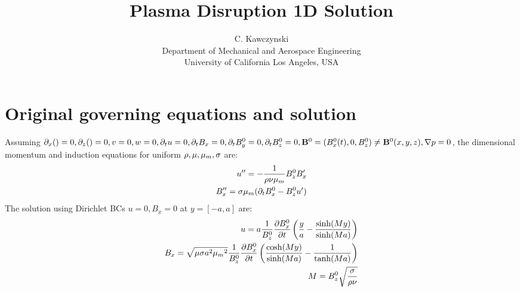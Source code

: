 \documentclass[11pt]{article}
\begin{document}
\doublespacing
\title{Plasma Disruption 1D Solution}
\author{C. Kawczynski \\
Department of Mechanical and Aerospace Engineering \\
University of California Los Angeles, USA\\
}
\maketitle

\section{Original governing equations and solution}
Assuming $\partial_x () =0, \partial_z () = 0, v=0,w=0, \partial_t u = 0, \partial_t B_x = 0,\partial_t B_y^0 = 0, \partial_t B_z^0 = 0,\mathbf{B}^0 = (B_x^0(t),0,B_z^0) \ne \mathbf{B}^0(x,y,z), \nabla p =0$, the dimensional momentum and induction equations for uniform $\rho,\mu,{\mu_m},\sigma$ are:
\begin{equation}\begin{aligned}
u''   = - \frac{1}{\rho \nu {\mu_m}} B_z^0 B_x' \\
B_x'' = \sigma {\mu_m} (\partial_t B_x^0 - B_z^0 u') \\
\end{aligned} \end{equation}
\noindent
The solution using Dirichlet BCs $u=0,B_x = 0$ at $y=[-a,a]$ are:
\begin{equation}\begin{aligned}
u   = a \frac{1}{B_z^0} \frac{\partial B_x^0}{\partial t} \left( \frac{y}{a} - \frac{\sinh(M y)}{\sinh(M a)} \right) \\
B_x = \sqrt{\mu \sigma a^2 {\mu_m}^2} \frac{1}{B_z^0} \frac{\partial B_x^0}{\partial t} \left( \frac{\cosh(M y)}{\sinh(M a)} - \frac{1}{\tanh(M a)} \right) \\
M = B_z^0 \sqrt{\frac{\sigma}{\rho \nu}} \\
\end{aligned} \end{equation}
\end{document}
